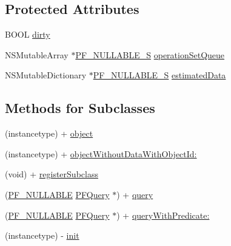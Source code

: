 \subsection*{Protected Attributes}
\begin{DoxyCompactItemize}
\item 
B\+O\+O\+L \hyperlink{interface_p_f_object_a7de11c083384297eb896760eab880ecf}{dirty}
\item 
N\+S\+Mutable\+Array $\ast$\hyperlink{_p_f_nullability_8h_ada31c80e56a25740ae808dccdacc9f1a}{P\+F\+\_\+\+N\+U\+L\+L\+A\+B\+L\+E\+\_\+\+S} \hyperlink{interface_p_f_object_acb2994f40fd392505e774a92f501c84c}{operation\+Set\+Queue}
\item 
N\+S\+Mutable\+Dictionary $\ast$\hyperlink{_p_f_nullability_8h_ada31c80e56a25740ae808dccdacc9f1a}{P\+F\+\_\+\+N\+U\+L\+L\+A\+B\+L\+E\+\_\+\+S} \hyperlink{interface_p_f_object_acf0bccf3bb9bcbd996ef9bc59a14108b}{estimated\+Data}
\end{DoxyCompactItemize}
\subsection*{Methods for Subclasses}
\label{_amgrp4855bbbf49c1c72434fd4c207435763a}%


 

 \begin{DoxyCompactItemize}
\item 
(instancetype) + \hyperlink{interface_p_f_object_a04d543b41a02f273bbf2dde644e5e0ef}{object}
\item 
(instancetype) + \hyperlink{interface_p_f_object_afb4e4b2170ba91ae798f94833c6686bb}{object\+Without\+Data\+With\+Object\+Id\+:}
\item 
(void) + \hyperlink{interface_p_f_object_a44be6ed21a7d2807fe8c0e420a3ea736}{register\+Subclass}
\item 
(\hyperlink{_p_f_nullability_8h_a528d97a96c5fb279a45c378f5657fca2}{P\+F\+\_\+\+N\+U\+L\+L\+A\+B\+L\+E} \hyperlink{interface_p_f_query}{P\+F\+Query} $\ast$) + \hyperlink{interface_p_f_object_a13571072ecdde530ba4a0c2c90e451f1}{query}
\item 
(\hyperlink{_p_f_nullability_8h_a528d97a96c5fb279a45c378f5657fca2}{P\+F\+\_\+\+N\+U\+L\+L\+A\+B\+L\+E} \hyperlink{interface_p_f_query}{P\+F\+Query} $\ast$) + \hyperlink{interface_p_f_object_ac982b71a43cc2a36f37b9e71115b2daa}{query\+With\+Predicate\+:}
\item 
(instancetype) -\/ \hyperlink{interface_p_f_object_a174f279ef1d936f8b9d3ffad226c0a6b}{init}
\end{DoxyCompactItemize}
